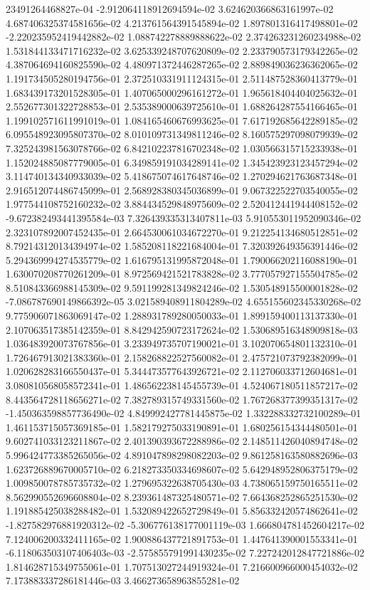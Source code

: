 23491264468827e-04	-2.912064118912694594e-02	3.624620366863161997e-02	4.687406325374581656e-02	4.213761564391545894e-02	1.897801316417498801e-02	-2.220235952419442882e-02	1.088742278889888622e-02	2.374263231260234988e-02	1.531844133471716232e-02	3.625339248707620809e-02	2.233790573179342265e-02	4.387064694160825590e-02	4.480971372446287265e-02	2.889849036236362065e-02	1.191734505280194756e-01	2.372510331911124315e-01	2.511487528360413779e-01	1.683439173201528305e-01	1.407065000296161272e-01	1.965618404404025632e-01	2.552677301322728853e-01	2.535389000639725610e-01	1.688264287554166465e-01	1.199102571611991019e-01	1.084165460676993625e-01	7.617192685642289185e-02	6.095548923095807370e-02	8.010109731349811246e-02	8.160575297098079939e-02	7.325243981563078766e-02	6.842102237816702348e-02	1.030566315715233938e-01	1.152024885087779005e-01	6.349859191034289141e-02	1.345423923123457294e-02	3.114740134340933039e-02	5.418675074617648746e-02	1.270294621763687348e-01	2.916512074486745099e-01	2.568928380345036899e-01	9.067322522703540055e-02	1.977544108752160232e-02	3.884434529848975609e-02	2.520412441944408152e-02	-9.672382493441395584e-03	7.326439335313407811e-03	5.910553011952090346e-02	2.323107892007452435e-01	2.664530061034672270e-01	9.212254134680512851e-02	8.792143120134394974e-02	1.585208118221684004e-01	7.320392649356391446e-02	5.294369994274535779e-02	1.616795131995872048e-01	1.790066202116088190e-01	1.630070208770261209e-01	8.972569421521783828e-02	3.777057927155504785e-02	8.510843366988145309e-02	9.591199281349824246e-02	1.530548915500001828e-02	-7.086787690149866392e-05	3.021589408911804289e-02	4.655155602345330268e-02	9.775906071863069147e-02	1.288931789280050033e-01	1.899159400113137330e-01	2.107063517385142359e-01	8.842942590723172624e-02	1.530689516348909818e-03	1.036483920073767856e-01	3.233949735707190021e-01	3.102070654801132310e-01	1.726467913021383360e-01	2.158268822527560082e-01	2.475721073792382099e-01	1.020628283166550437e-01	5.344473577643926721e-02	2.112706033712604681e-01	3.080810568058572341e-01	1.486562238145455739e-01	4.524067180511857217e-02	8.443564728118656271e-02	7.382789315749331560e-02	1.767268377399351317e-02	-1.450363598857736490e-02	4.849992427781445875e-02	1.332288332732100289e-01	1.461153715057369185e-01	1.582179275033190891e-01	1.680256154344480501e-01	9.602741033123211867e-02	2.401390393672288986e-02	2.148511426040894748e-02	5.996424773385265056e-02	4.891047898298082203e-02	9.861258163580882696e-03	1.623726889670005710e-02	6.218273350334698607e-02	5.642948952806375179e-02	1.009850078785735732e-02	1.279695322638705430e-03	4.738065159750165511e-02	8.562990552696608804e-02	8.239361487325480571e-02	7.664368252865251530e-02	1.191885425038288482e-01	1.532089422652729849e-01	5.856332420574862641e-02	-1.827582976881920312e-02	-5.306776138177001119e-03	1.666804781452604217e-02	7.124006200332411165e-02	1.900886437721891753e-01	1.447641390001553341e-01	-6.118063503107406403e-03	-2.575855791991430235e-02	7.227242012847721886e-02	1.814628715349755061e-01	1.707513027244919324e-01	7.216600966000454032e-02	7.173883337286181446e-03	3.466273658963855281e-02
